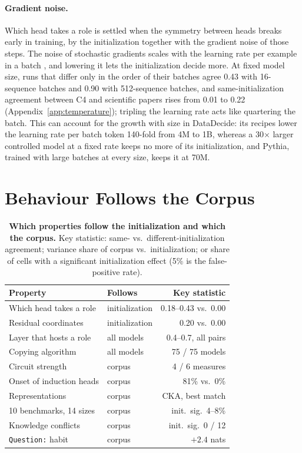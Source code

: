 \documentclass[11pt]{article}
\newcommand{\byinit}[1]{\textcolor{init}{#1}}
\newcommand{\bycorpus}[1]{\textcolor{corpus}{#1}}
\newcommand{\tmpl}[1]{\texttt{#1}}
\begin{document}
\paragraph{Gradient noise.}
Which head takes a role is settled when the symmetry between heads breaks early in training, by the initialization together with the gradient noise of those steps.
The noise of stochastic gradients scales with the learning rate per example in a batch \citep{smith2018bayesian,jastrzebski2018three}, and lowering it lets the initialization decide more.
At fixed model size, runs that differ only in the order of their batches agree 0.43 with 16-sequence batches and 0.90 with 512-sequence batches, and same-initialization agreement between C4 and scientific papers rises from 0.01 to 0.22 (Appendix~\ref{app:temperature}); tripling the learning rate acts like quartering the batch.
This can account for the growth with size in DataDecide: its recipes lower the learning rate per batch token 140-fold from 4M to 1B, whereas a 30$\times$ larger controlled model at a fixed rate keeps no more of its initialization, and Pythia, trained with large batches at every size, keeps it at 70M.

\section{Behaviour Follows the Corpus}
\label{sec:boundary}

\begin{table}[t]
  \centering
  \footnotesize
  \setlength{\tabcolsep}{2.4pt}
  \begin{tabular}{@{}llr@{}}
    \toprule
    Property & Follows & Key statistic \\
    \midrule
    Which head takes a role & \byinit{initialization} & 0.18--0.43 vs.\ 0.00 \\
    Residual coordinates & \byinit{initialization} & 0.20 vs.\ 0.00 \\
    Layer that hosts a role & all models & 0.4--0.7, all pairs \\
    Copying algorithm & all models & 75 / 75 models \\
    Circuit strength & \bycorpus{corpus} & 4 / 6 measures \\
    Onset of induction heads & \bycorpus{corpus} & 81\% vs.\ 0\% \\
    Representations & \bycorpus{corpus} & CKA, best match \\
    10 benchmarks, 14 sizes & \bycorpus{corpus} & init.\ sig.\ 4--8\% \\
    Knowledge conflicts & \bycorpus{corpus} & init.\ sig.\ 0 / 12 \\
    \tmpl{Question:} habit & \bycorpus{corpus} & $+2.4$ nats \\
    \bottomrule
  \end{tabular}
  \caption{\textbf{Which properties follow the initialization and which the corpus.} Key statistic: same- vs.\ different-initialization agreement; variance share of corpus vs.\ initialization; or share of cells with a significant initialization effect (5\% is the false-positive rate).}
  \label{tab:map}
\end{table}
\end{document}
